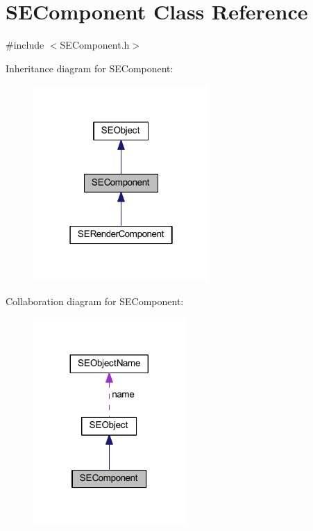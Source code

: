 \section{S\+E\+Component Class Reference}
\label{class_s_e_component}


{\ttfamily \#include $<$S\+E\+Component.\+h$>$}



Inheritance diagram for S\+E\+Component\+:
\nopagebreak
\begin{figure}[H]
\begin{center}
\leavevmode
\includegraphics[width=190pt]{class_s_e_component__inherit__graph}
\end{center}
\end{figure}


Collaboration diagram for S\+E\+Component\+:
\nopagebreak
\begin{figure}[H]
\begin{center}
\leavevmode
\includegraphics[width=164pt]{class_s_e_component__coll__graph}
\end{center}
\end{figure}
